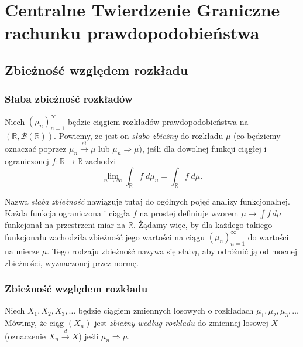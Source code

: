 \chapter{Centralne Twierdzenie Graniczne rachunku prawdopodobieństwa}
\section{Zbieżność względem rozkładu}
\subsection{Słaba zbieżność rozkładów}
	\begin{tw}
		Niech $(\mu_n)_{n=1}^\infty$ będzie ciągiem rozkładów prawdopodobieństwa na $(\mathbb{R}, \mathcal{B}(\mathbb{R}))$. Powiemy, że jest on \textit{słabo zbieżny} do rozkładu $\mu$ (co będziemy oznaczać poprzez $\mu_n \stackrel{\text{sł}}{\to} \mu$ lub $\mu_n \Rightarrow \mu$), jeśli dla dowolnej funkcji ciągłej i ograniczonej $f:\mathbb{R} \to \mathbb{R}$ zachodzi
		\begin{equation*}
			\lim\limits_{n \to \infty} \int_{\mathbb{R}} f \; d\mu_n = \int_{\mathbb{R}} f \; d\mu.
		\end{equation*}
	\end{tw}
	
	\begin{uwg}
		Nazwa \textit{słaba zbieżność} nawiązuje tutaj do ogólnych pojęć analizy funkcjonalnej. Każda funkcja ograniczona i ciągła $f$ na prostej definiuje wzorem $ \mu \to \int f \, d\mu$ funkcjonał na przestrzeni miar na $\mathbb{R}$. Żądamy więc, by dla każdego takiego funkcjonału zachodziła zbieżność jego wartości na ciągu $(\mu_n)_{n=1}^\infty$ do wartości na mierze $\mu$.
		Tego rodzaju zbieżność nazywa się słabą, aby odróżnić ją od mocnej zbieżności, wyznaczonej przez normę.
	\end{uwg}

	\subsection{Zbieżność względem rozkładu}	
	\begin{df}
		Niech $X_1, X_2, X_3, \ldots$ będzie ciągiem zmiennych losowych o rozkładach $\mu_1, \mu_2, \mu_3, \ldots$ Mówimy, że ciąg $(X_n)$ jest \textit{zbieżny według rozkładu} do zmiennej losowej $X$ (oznaczenie $X_n \stackrel{d}{\to} X$) jeśli $\mu_n \Rightarrow \mu$.
	\end{df}
	
